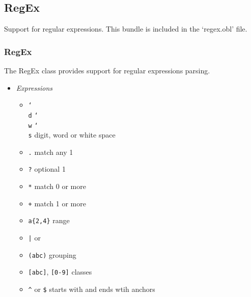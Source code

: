 \documentclass[11pt]{article}
\begin{document}
\subsection{RegEx}
Support for regular expressions.  This bundle is included in the `regex.obl' file.

\subsubsection{RegEx}
The RegEx class provides support for regular expressions parsing.

\begin{itemize}
\item \textit{Expressions}
  \begin{itemize}
  \item \texttt{\char`\\d} \texttt{\char`\\w} \texttt{\char`\\s}
    digit, word or white space
  \item \texttt{.} match any 1
  \item \texttt{?} optional 1
  \item \texttt{*} match 0 or more
  \item \texttt{+} match 1 or more
  \item \texttt{a\{2,4\}} range
  \item \texttt{|} or
  \item \texttt{(abc)} grouping
  \item \texttt{[abc]}, \texttt{[0-9]} classes
  \item \texttt{\^} or \texttt{\$} starts with and ends wtih anchors
  \end{itemize}
\end{itemize}
\end{document}
